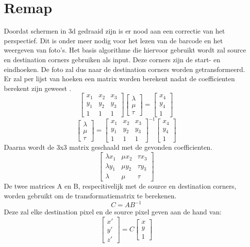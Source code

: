 \section{Remap}
Doordat schermen in 3d gedraaid zijn is er nood aan een correctie van het perspectief. Dit is onder meer nodig voor het lezen van de barcode en het weergeven van foto's. Het basis algorithme die hiervoor gebruikt wordt zal source en destination corners gebruiken als input. Deze corners zijn de start- en eindhoeken. De foto zal dus naar de destination corners worden getransformeerd. Er zal per lijst van hoeken een matrix worden berekent nadat de coefficienten berekent zijn geweest .
$$ \begin{bmatrix}
x_1 & x_2 & x_3 \\ y_1 & y_2 & y_3 \\ 1 & 1 & 1
\end{bmatrix} \begin{bmatrix}
\lambda \\ \mu \\ \tau
\end{bmatrix} =
\begin{bmatrix}
x_4 \\ y_4 \\ 1
\end{bmatrix}
$$
$$ \begin{bmatrix}
\lambda \\ \mu \\ \tau
\end{bmatrix} =\begin{bmatrix}
x_1 & x_2 & x_3 \\ y_1 & y_2 & y_3 \\ 1 & 1 & 1
\end{bmatrix}^{-1}
\begin{bmatrix}
x_4 \\ y_4 \\ 1
\end{bmatrix}
$$
Daarna wordt de 3x3 matrix geschaald met de gevonden coefficienten.
$$
\begin{bmatrix}
\lambda x_1 & \mu x_2 & \tau x_3 \\ \lambda y_1 & \mu y_2 & \tau y_3 \\ \lambda & \mu & \tau
\end{bmatrix}
$$
De twee matrices A en B, respecitivelijk met de source en destination corners, worden gebruikt om de transformatiematrix te berekenen.
$$ C = AB^{-1}$$
Deze zal elke destination pixel en de source pixel geven aan de hand van:
$$
\begin{bmatrix}
x' \\ y' \\ z'
\end{bmatrix} = C\begin{bmatrix}
x \\ y \\ 1
\end{bmatrix}
$$
